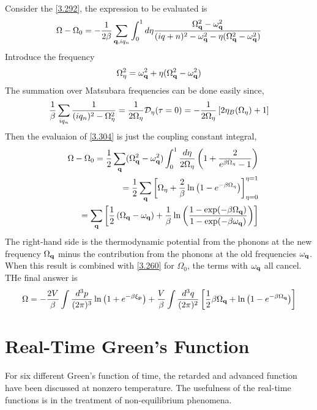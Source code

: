 Consider the \eqref{3.292}, the expression to be evaluated is
\begin{equation}
    \Omega-\Omega_0 = - \frac{1}{2\beta} \sum_{\mathbf{q},iq_n} \int_0^1 d\eta \frac{\Omega_{\mathbf{q}}^2 -\omega_{\mathbf{q}}^2}{(iq+n)^2 -\omega_{\mathbf{q}}^2 -\eta(\Omega_{\mathbf{q}}^2-\omega_{\mathbf{q}}^2)}  \label{3.304}
\end{equation}
Introduce the frequency
\begin{equation}
    \Omega_\eta^2 = \omega^2_{\mathbf{q}} + \eta(\Omega_{\mathbf{q}}^2 - \omega_{\mathbf{q}}^2)    \label{3.305}
\end{equation}
The summation over Matsubara frequencies can be done easily since,
\begin{equation}
    \frac{1}{\beta} \sum_{iq_n} \frac{1}{(iq_n)^2 - \Omega_\eta^2} = \frac{1}{2\Omega_\eta} \mathcal{D}_\eta(\tau=0) = - \frac{1}{2\Omega_\eta} \left[ 2\eta_B(\Omega_\eta)+1 \right]   \label{3.306}
\end{equation}
Then the evaluaion of \eqref{3.304} is just the coupling constant integral,
\begin{eqnarray}
    &&\Omega-\Omega_0 = \frac{1}{2} \sum_{\mathbf{q}} (\Omega_{\mathbf{q}}^2 - \omega_{\mathbf{q}}^2) \int_0^1 \frac{d\eta}{2\Omega_\eta} \left(1 + \frac{2}{e^{\beta\Omega_\eta}-1}\right) \nonumber \\
    &&= \frac{1}{2} \sum_{\mathbf{q}} \left[ \Omega_\eta + \frac{2}{\beta} \ln \left(1-e^{-\beta\Omega_\eta} \right) \right]^{\eta=1}_{\eta=0} \nonumber \\
    &&= \sum_{\mathbf{q}} \left[ \frac{1}{2} \left( \Omega_{\mathbf{q}} - \omega_{\mathbf{q}} \right) + \frac{1}{\beta} \ln \left( \frac{1-\exp (-\beta \Omega_{\mathbf{q}}) }{1- \exp(-\beta \omega_{\mathbf{q}})} \right)\right] \label{3.310}
\end{eqnarray}
The right-hand side is the thermodynamic potential from the phonons at the new frequency $\Omega_{\mathbf{q}}$ minus the contribution from the phonons at the old frequencies $\omega_{\mathbf{q}}$.
When this result is combined with \eqref{3.260} for $\Omega_0$, the terms with $\omega_{\mathbf{q}}$ all cancel. THe final answer is
\begin{equation}
    \Omega = -\frac{2V}{\beta} \int \frac{d^3 p}{(2\pi)^3} \ln \left( 1 + e^{-\beta \xi_{\mathbf{p}}} \right) + \frac{V}{\beta} \int \frac{d^3 q}{(2\pi)^2} \left[ \frac{1}{2} \beta \Omega_{\mathbf{q}} + \ln\left( 1-e^{-\beta \Omega_{\mathbf{q}}}  \right) \right]      \label{3.311}
\end{equation}

\section{Real-Time Green's Function} \label{s.3.7}
For six different Green's function of time, the retarded and advanced function have been discussed at nonzero temperature.
The usefulness of the real-time functions is in the treatment of non-equilibrium phenomena.

